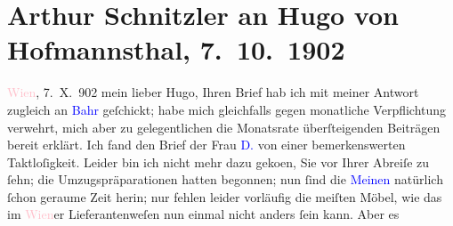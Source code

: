 

               \section[Arthur Schnitzler an Hugo von Hofmannsthal, 7. 10. 1902]{ Arthur Schnitzler an Hugo von Hofmannsthal, 7. 10. 1902}\nopagebreak{}\rehead{ }\normalsize\beginnumbering{} \toendnotes[C]{\smallbreak\pagebreak[2]} 
\toendnotes[C]{\smallbreak}\pstart
           \raggedleft{}{\pb}\textcolor{pink}{Wien}{}\ledrightnote{\textcolor{pink}{Wien}}, 7. X. 902\pend
           \pstart
           mein lieber Hugo,  Ihren Brief hab ich mit meiner Antwort
                    zugleich an \textcolor{blue}{Bahr}{}\ledrightnote{\textcolor{blue}{Hermann Bahr}} geſchickt; habe mich
                    gleichfalls gegen monatliche Verpflichtung verwehrt, mich aber zu gelegentlichen
                    die Monatsrate überſteigenden Beiträgen bereit erklärt. Ich fand den Brief der
                    Frau \textcolor{blue}{D.}{}\ledrightnote{\textcolor{blue}{Paula Dehmel}} von einer bemerkenswerten
                    Taktloſigkeit.\pend
           \pstart
           Leider bin ich nicht mehr dazu geko{\geminationm}en, Sie vor
                    Ihrer Abreiſe zu ſehn; die Um{\pb}zugspräparationen
                    hatten begonnen; nun ſind die \textcolor{blue}{Meinen}{} natürlich ſchon geraume Zeit herin; nur fehlen
                    leider vorläufig die meiſten Möbel, wie das im \textcolor{pink}{Wien}{}\ledrightnote{\textcolor{pink}{Wien}}er Lieferantenweſen nun einmal nicht anders ſein kann. Aber es
